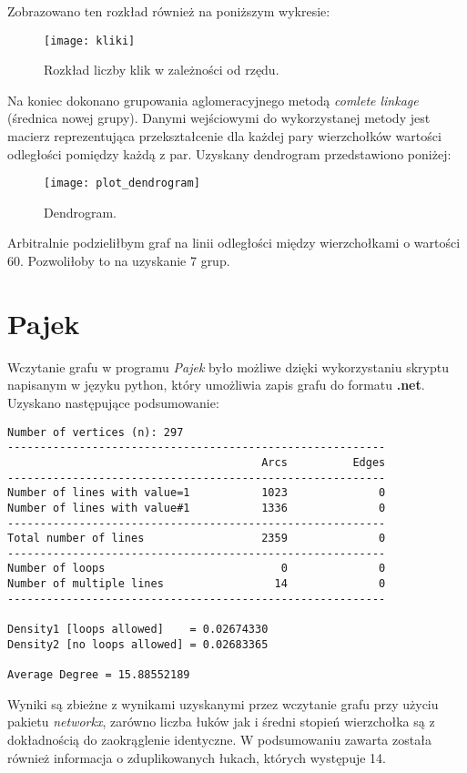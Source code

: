 \documentclass[10pt,a4paper]{article}
\begin{document}
Zobrazowano ten rozkład również na poniższym wykresie:
\begin{figure}[H]
	\centering
	\texttt{[image: kliki]}
	\caption{Rozkład liczby klik w zależności od rzędu.
	\label{fig:kliki}}
\end{figure}

Na koniec dokonano grupowania aglomeracyjnego metodą \textit{comlete linkage} (średnica nowej grupy). Danymi wejściowymi do wykorzystanej metody jest macierz reprezentująca przekształcenie dla każdej pary wierzchołków wartości odległości pomiędzy każdą z par. Uzyskany dendrogram przedstawiono poniżej:
\begin{figure}[H]
	\centering
	\texttt{[image: plot\_dendrogram]}
	\caption{Dendrogram.
	\label{fig:plot_dendrogram}}
\end{figure}

Arbitralnie podzieliłbym graf na linii odległości między wierzchołkami o wartości 60. Pozwoliłoby to na uzyskanie 7 grup.

\section{Pajek}
Wczytanie grafu w programu \textit{Pajek} było możliwe dzięki wykorzystaniu skryptu napisanym w języku python, który umożliwia zapis grafu do formatu \textbf{.net}. Uzyskano następujące podsumowanie:
\begin{verbatim}
Number of vertices (n): 297
----------------------------------------------------------
                                       Arcs          Edges
----------------------------------------------------------
Number of lines with value=1           1023              0
Number of lines with value#1           1336              0
----------------------------------------------------------
Total number of lines                  2359              0
----------------------------------------------------------
Number of loops                           0              0
Number of multiple lines                 14              0
----------------------------------------------------------

Density1 [loops allowed]    = 0.02674330
Density2 [no loops allowed] = 0.02683365

Average Degree = 15.88552189
\end{verbatim}

Wyniki są zbieżne z wynikami uzyskanymi przez wczytanie grafu przy użyciu pakietu \textit{networkx}, zarówno liczba łuków jak i średni stopień wierzchołka są z dokładnością do zaokrąglenie identyczne. W podsumowaniu zawarta została również informacja o zduplikowanych łukach, których występuje 14.
\end{document}

